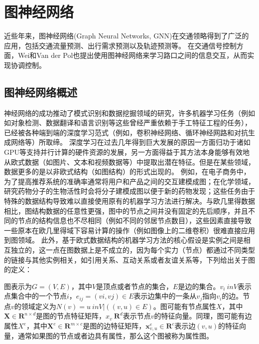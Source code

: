 \section{图神经网络}
近些年来，图神经网络(Graph Neural Networks, GNN)在交通领略得到了广泛的应用，包括交通流量预测\cite{zhang2018kernel,guo2019attention}、出行需求预测\cite{shi2020predicting,hu2020stochastic}以及轨迹预测\cite{li2020social,sun2019socially,monti2021dag}等。
在交通信号控制方面，Wei\cite{wei2019colight}和Van der Pol\cite{van2016coordinated}也提出使用图神经网络来学习路口之间的信息交互，从而实现协调控制。
\subsection{图神经网络概述}
神经网络的成功推动了模式识别和数据挖掘领域的研究，许多机器学习任务（例如如对象检测、数据翻译和语言识别等这些曾经严重依赖于手工特征工程的任务），已经被各种端到端的深度学习范式（例如，卷积神经网络、循环神经网路和对抗生成网络等）所取缔。
深度学习在过去几年得到巨大发展的原因一方面归功于诸如GPU等支持并行计算的硬件资源的发展，另一方面得益于其方法本身能够有效地从欧式数据（如图片、文本和视频数据等）中提取出潜在特征。但是在某些领域，数据更多的是以非欧式结构（如图结构）的形式出现的。
例如，在电子商务中，为了提高推荐系统的准确率通常将用户和产品之间的交互建模成图；在化学领域，研究药物分子的生物活性时会将分子建模成图以便于新的药物发现；这些任务由于特殊的数据结构导致难以直接使用原有的机器学习方法进行解决。与欧几里得数据相比，图结构数据的任意性更强，图中的节点之间并没有固定的先后顺序，并且不同的节点的结构信息也不尽相同（例如不同的邻居节点数目），这些因素直接导致一些原本在欧几里得域下容易计算的操作（例如图像上的二维卷积）很难直接应用到图领域。
此外，基于欧式数据结构的机器学习方法的核心假设是实例之间是相互独立的，这一点在图数据上是不成立的，因为每个实力（节点）都通过不同类型的链接与其他实例相关，如引用关系、互动关系或者友谊关系等，下列给出关于图的定义：
\begin{definition}[图]
\label{def:graph}
\end{definition}
图表示为$G=(V,E)$，其中$V$是顶点或者节点的集合，$E$是边的集合。$v_i \ in V$表示点集合中的一个节点$i$，$e_{ij}=(vi, vj) \in E$表示边集中的一条从$v_j$指向$v_i$的边。节点$v$的领域定义为$N(v)={u \ in V| ((v,u) \in E)}$。图可能有节点属性$X$，其中$\mathbf{X} \in \mathbf{R}^{n \times d}$是图的节点特征矩阵，$x_v \ \mathbf{R}^d$表示节点$v$的特征向量。同理，图可能有边属性$X^e$，其中$\mathbf{X}^{e} \in \mathbf{R}^{m \times c}$是图的边特征矩阵，$\mathbf{x}_{v, u}^{e} \in \mathbf{R}^{c}$表示边$(v,u)$的特征向量，通常如果图的节点或者边具有属性，那么这个图被称为属性图。

